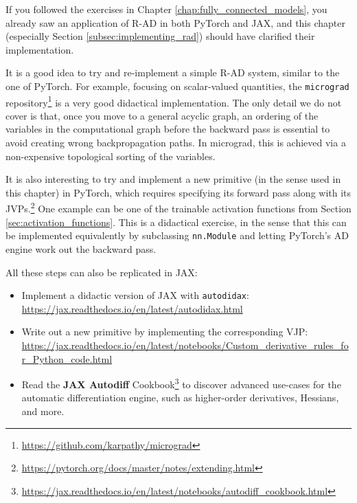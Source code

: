 If you followed the exercises in Chapter \ref{chap:fully_connected_models}, you already saw an application of R-AD in both PyTorch and JAX, and this chapter (especially Section \ref{subsec:implementing_rad}) should have clarified their implementation.

It is a good idea to try and re-implement a simple R-AD system, similar to the one of PyTorch. For example, focusing on scalar-valued quantities, the \texttt{micrograd} repository\footnote{\url{https://github.com/karpathy/micrograd}} is a very good didactical implementation. The only detail we do not cover is that, once you move to a general acyclic graph, an ordering of the variables in the computational graph before the backward pass is essential to avoid creating wrong backpropagation paths. In micrograd, this is achieved via a non-expensive topological sorting of the variables.

It is also interesting to try and implement a new primitive (in the sense used in this chapter) in PyTorch, which requires specifying its forward pass along with its JVPs.\footnote{\url{https://pytorch.org/docs/master/notes/extending.html}} One example can be one of the trainable activation functions from Section \ref{sec:activation_functions}. This is a didactical exercise, in the sense that this can be implemented equivalently by subclassing \texttt{nn.Module} and letting PyTorch's AD engine work out the backward pass.

All these steps can also be replicated in JAX:
\begin{itemize}
\item Implement a didactic version of JAX with \texttt{autodidax}: \url{https://jax.readthedocs.io/en/latest/autodidax.html}
\item Write out a new primitive by implementing the corresponding VJP: \url{https://jax.readthedocs.io/en/latest/notebooks/Custom_derivative_rules_for_Python_code.html}
\item Read the \textbf{JAX Autodiff} Cookbook\footnote{\url{https://jax.readthedocs.io/en/latest/notebooks/autodiff_cookbook.html}} to discover advanced use-cases for the automatic differentiation engine, such as higher-order derivatives, Hessians, and more. 
\end{itemize}